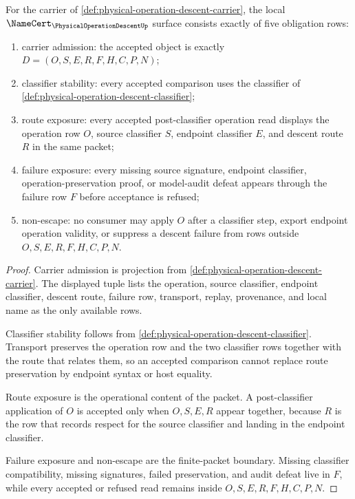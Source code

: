 \begin{theorem}
\label{thm:physical-operation-descent-namecert-obligations}
For the carrier of \autoref{def:physical-operation-descent-carrier}, the local $\NameCert_{\PhysicalOperationDescentUp}$ surface consists exactly of five obligation rows:
\begin{enumerate}
\item carrier admission: the accepted object is exactly $D=(O,S,E,R,F,H,C,P,N)$;
\item classifier stability: every accepted comparison uses the classifier of \autoref{def:physical-operation-descent-classifier};
\item route exposure: every accepted post-classifier operation read displays the operation row $O$, source classifier $S$, endpoint classifier $E$, and descent route $R$ in the same packet;
\item failure exposure: every missing source signature, endpoint classifier, operation-preservation proof, or model-audit defeat appears through the failure row $F$ before acceptance is refused;
\item non-escape: no consumer may apply $O$ after a classifier step, export endpoint operation validity, or suppress a descent failure from rows outside $O,S,E,R,F,H,C,P,N$.
\end{enumerate}
\end{theorem}
\begin{proof}
Carrier admission is projection from \autoref{def:physical-operation-descent-carrier}. The displayed tuple lists the operation, source classifier, endpoint classifier, descent route, failure row, transport, replay, provenance, and local name as the only available rows.

Classifier stability follows from \autoref{def:physical-operation-descent-classifier}. Transport preserves the operation row and the two classifier rows together with the route that relates them, so an accepted comparison cannot replace route preservation by endpoint syntax or host equality.

Route exposure is the operational content of the packet. A post-classifier application of $O$ is accepted only when $O,S,E,R$ appear together, because $R$ is the row that records respect for the source classifier and landing in the endpoint classifier.

Failure exposure and non-escape are the finite-packet boundary. Missing classifier compatibility, missing signatures, failed preservation, and audit defeat live in $F$, while every accepted or refused read remains inside $O,S,E,R,F,H,C,P,N$.
\end{proof}

